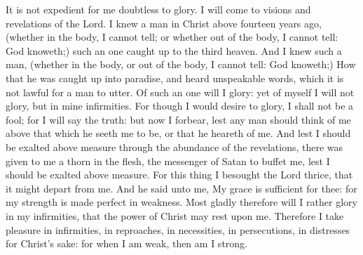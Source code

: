  It is not expedient for me doubtless to glory. I will
come to visions and revelations of the Lord.  I knew a man
in Christ above fourteen years ago, (whether in the body, I cannot tell;
or whether out of the body, I cannot tell: God knoweth;) such an one
caught up to the third heaven.  And I knew such a man,
(whether in the body, or out of the body, I cannot tell: God knoweth;)
 How that he was caught up into paradise, and heard
unspeakable words, which it is not lawful for a man to utter.
 Of such an one will I glory: yet of myself I will not
glory, but in mine infirmities.  For though I would desire
to glory, I shall not be a fool; for I will say the truth: but now I
forbear, lest any man should think of me above that which he seeth me to
be, or that he heareth of me.  And lest I should be
exalted above measure through the abundance of the revelations, there
was given to me a thorn in the flesh, the messenger of Satan to buffet
me, lest I should be exalted above measure.  For this
thing I besought the Lord thrice, that it might depart from me.
 And he said unto me, My grace is sufficient for thee: for
my strength is made perfect in weakness. Most gladly therefore will I
rather glory in my infirmities, that the power of Christ may rest upon
me.  Therefore I take pleasure in infirmities, in
reproaches, in necessities, in persecutions, in distresses for Christ's
sake: for when I am weak, then am I strong.

